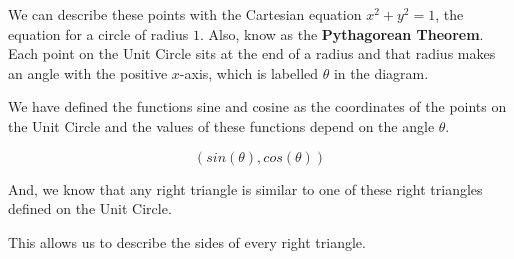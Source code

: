 \documentclass{ximera}
\begin{document}
We can describe these points with the Cartesian equation $x^2 + y^2 = 1$, the equation for a circle of radius $1$. Also, know as the \textbf{Pythagorean Theorem}.\\



Each point on the Unit Circle sits at the end of a radius and that radius makes an angle with the positive $x$-axis, which is labelled $\theta$ in the diagram.




We have defined the functions sine and cosine as the coordinates of the points on the Unit Circle and the values of these functions depend on the angle $\theta$.

\[    ( sin(\theta), cos(\theta) ) \]




And, we know that any right triangle is similar to one of these right triangles defined on the Unit Circle.


This allows us to describe the sides of every right triangle.
\end{document}
